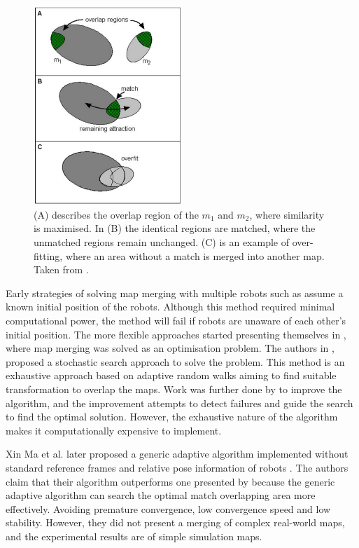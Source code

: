 \begin{figure}[H]
    \centering
    \includegraphics[width=0.5\textwidth]{UCT_MSc_Thesis/figs/overlap_example.png}
    \caption[Overlap matching example]{(A) describes the overlap region of the $m_1$ and $m_2$, where similarity is maximised. In (B) the identical regions are matched, where the unmatched regions remain unchanged. (C) is an example of over-fitting, where an area without a match is merged into another map. Taken from \cite{Birk2006}.}
    \label{fig:overlap}
\end{figure}


Early strategies of solving map merging with multiple robots such as \cite{Burgard2000} assume a known initial position of the robots. Although this method required minimal computational power, the method will fail if robots are unaware of each other's initial position. The more flexible approaches started presenting themselves in \cite{Carpin2005}, where map merging was solved as an optimisation problem. The authors in \cite{Carpin2005}, proposed a stochastic search approach to solve the problem. This method is an exhaustive approach based on adaptive random walks aiming to find suitable transformation to overlap the maps. Work was further done by \cite{Birk2006a} to improve the algorithm, and the improvement attempts to detect failures and guide the search to find the optimal solution. However, the exhaustive nature of the algorithm makes it computationally expensive to implement.

Xin Ma et al. later proposed a generic adaptive algorithm implemented without standard reference frames and relative pose information of robots \cite{XinMa2008}. The authors claim that their algorithm outperforms one presented by \cite{Carpin2005} because the generic adaptive algorithm can search the optimal match overlapping area more effectively. Avoiding premature convergence, low convergence speed and low stability. However, they did not present a merging of complex real-world maps, and the experimental results are of simple simulation maps. 

